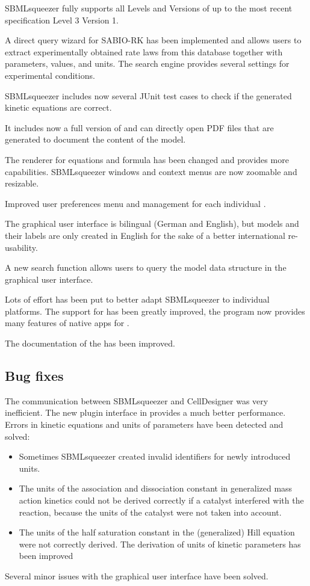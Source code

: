 SBMLsqueezer fully supports all Levels and Versions of \SBML up to the most
recent specification Level 3 Version 1.

A direct query wizard for SABIO-RK has been implemented and allows users to
extract experimentally obtained rate laws from this database together with
parameters, values, and units. The search engine provides several settings for
experimental conditions.

SBMLsqueezer includes now several JUnit test cases to check if the generated
kinetic equations are correct.

It includes now a full version of \SBMLLaTeX and can directly open PDF files
that are generated to document the content of the model.

The renderer for equations and formula has been changed and provides more
capabilities. SBMLsqueezer windows and context menus are now zoomable and
resizable.

Improved user preferences menu and management for each individual \OS.

The graphical user interface is bilingual (German and English), but models and
their labels are only created in English for the sake of a better international
re-usability.

A new search function allows users to query the model data structure in the
graphical user interface.

Lots of effort has been put to better adapt SBMLsqueezer to individual
platforms. The support for \MacOSX has been greatly improved, the program now
provides many features of native apps for \MacOSX.

The documentation of the \API has been improved.

\subsection{Bug fixes}

The communication between SBMLsqueezer and CellDesigner was very inefficient.
The new plugin interface in \JSBML provides a much better performance.
Errors in kinetic equations and units of parameters have been detected and
solved:
\begin{itemize}
\item Sometimes SBMLsqueezer created invalid identifiers for newly introduced
      units.
\item The units of the association and dissociation constant in generalized mass
      action kinetics could not be derived correctly if a catalyst interfered
      with the reaction, because the units of the catalyst were not taken into
      account.
\item The units of the half saturation constant in the (generalized) Hill
      equation were not correctly derived. The derivation of units of kinetic
      parameters has been improved
\end{itemize}  
Several minor issues with the graphical user interface have been solved.

